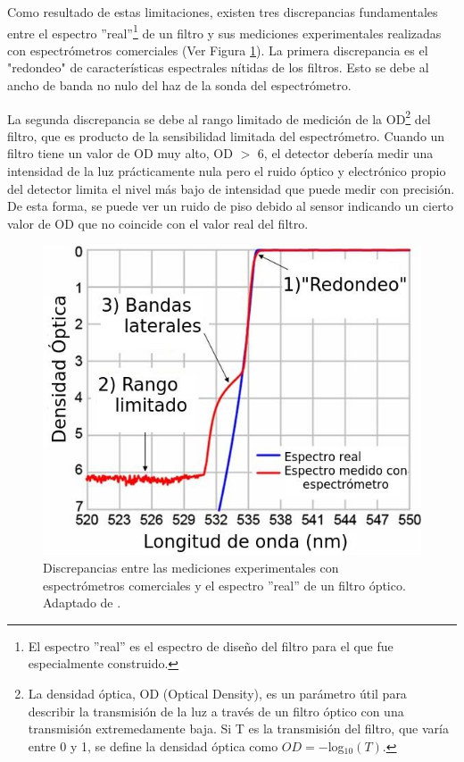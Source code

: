 \documentclass{ctuthesis}
\begin{document}
Como resultado de estas limitaciones, existen tres discrepancias fundamentales 
entre el espectro ''real''\footnote{El espectro ''real'' es 
	el espectro de diseño del filtro para el que fue especialmente construido.} 
	de 
un 
filtro y sus mediciones experimentales realizadas con 
espectrómetros comerciales (Ver Figura \ref{fig:obj1a})\cite{Semrock}. La 
primera discrepancia es el "redondeo" de características espectrales nítidas de 
los filtros. 
Esto se debe al ancho de banda no nulo del haz de la sonda del 
espectrómetro. 


La segunda discrepancia se debe al rango limitado de 
medición de la OD\footnote{La densidad óptica, OD (Optical Density), es un 
	parámetro útil para describir la transmisión de la luz a través de un 
	filtro 
	óptico con una transmisión extremedamente baja. Si T es la transmisión del 
	filtro, que varía entre 0 y 1, se define la densidad óptica como $OD = 
	-$log$_{10} (T)$.} del filtro, que es 
producto de la sensibilidad limitada del espectrómetro. Cuando un filtro 
tiene un valor de OD muy alto, OD $>$ 6, el detector debería medir una 
intensidad de la luz prácticamente nula pero el ruido óptico y electrónico 
propio del detector limita el nivel más bajo de intensidad que puede medir 
con precisión. De esta forma, se puede ver un ruido de piso debido al 
sensor indicando un cierto valor de OD que no coincide con el valor real 
del filtro.

\begin{figure}[h!]
	\centering
	\includegraphics[scale=0.8]{Figs/plan_de_tesis/measurement_of_optical_filter.jpg}
	\caption{Discrepancias entre las mediciones experimentales con 
		espectrómetros 
		comerciales y el espectro ''real'' de un filtro óptico. Adaptado de 
		\cite{Semrock}.}
	\label{fig:obj1a}
\end{figure}
\end{document}

